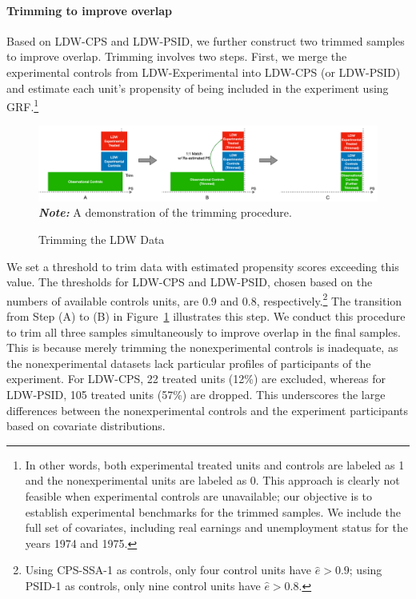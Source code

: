 \documentclass[letterpaper,12pt,leqno]{article}
\begin{document}
\paragraph{Trimming to improve overlap} Based on LDW-CPS and LDW-PSID, we further construct two trimmed samples to improve overlap. Trimming involves two steps. First, we merge the experimental controls from LDW-Experimental into LDW-CPS (or LDW-PSID) and estimate each unit's propensity of being included in the experiment using GRF.\footnote{In other words, both experimental treated units and controls are labeled as 1 and the nonexperimental units are labeled as 0. This approach is clearly not feasible when experimental controls are unavailable; our objective is to establish experimental benchmarks for the trimmed samples. We include the full set of covariates, including real earnings and unemployment status for the years 1974 and 1975.} 
\begin{figure}[!th]
\caption{Trimming the LDW Data}\label{fig:ldw.samples}
\vspace{-0.7em}
\begin{minipage}[c]{1\textwidth}
\includegraphics[width=\textwidth]{samples.png}
{\footnotesize\textbf{\textit{Note:}} A demonstration of the trimming procedure.}
\end{minipage}%
\end{figure}
We set a threshold to trim data with estimated propensity scores exceeding this value. The thresholds for LDW-CPS and LDW-PSID, chosen based on the numbers of available controls units, are 0.9 and 0.8, respectively.\footnote{Using CPS-SSA-1 as controls, only four control units have $\hat{e} > 0.9$; using PSID-1 as controls, only nine control units have $\hat{e} > 0.8$.} The transition from Step (A) to (B) in Figure~\ref{fig:ldw.samples} illustrates this step. We conduct this procedure to trim all three samples simultaneously to improve overlap in the final samples. This is because merely trimming the nonexperimental controls is inadequate, as the nonexperimental datasets lack particular profiles of participants of the experiment. For LDW-CPS, 22 treated units (12\%) are excluded, whereas for LDW-PSID, 105 treated units (57\%) are dropped. This underscores the large differences between the nonexperimental controls and the experiment participants based on covariate distributions.
\end{document}
